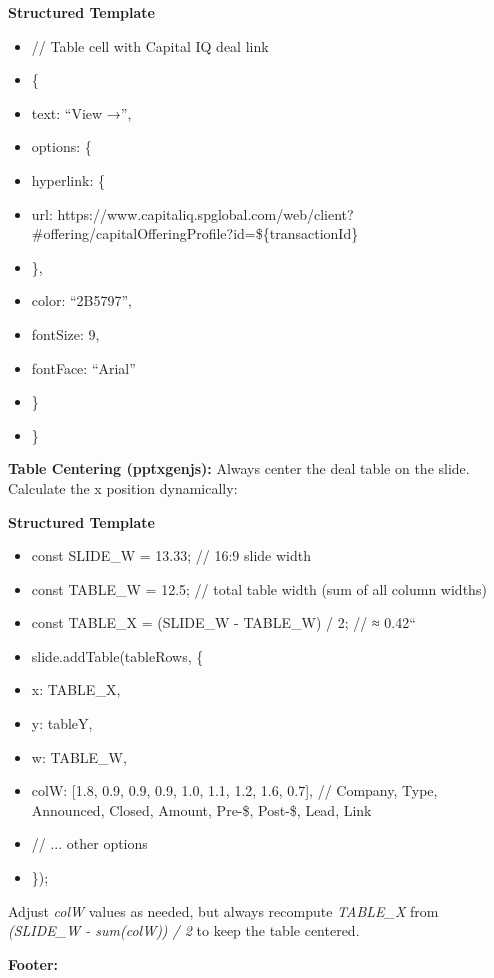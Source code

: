 \documentclass[11pt]{article}
\begin{document}
\textbf{Structured Template}
\begin{itemize}[leftmargin=*,itemsep=2pt,topsep=2pt]
\item {} // Table cell with Capital IQ deal link
\item {} \{
\item {} text: ``View →'',
\item {} options: \{
\item {} hyperlink: \{
\item {} url: https://www.capitaliq.spglobal.com/web/client?\#offering/capitalOfferingProfile?id=\$\{transactionId\}
\item {} \},
\item {} color: ``2B5797'',
\item {} fontSize: 9,
\item {} fontFace: ``Arial''
\item {} \}
\item {} \}
\end{itemize}

\textbf{Table Centering (pptxgenjs):} Always center the deal table on the slide. Calculate the x position dynamically:

\textbf{Structured Template}
\begin{itemize}[leftmargin=*,itemsep=2pt,topsep=2pt]
\item {} const SLIDE\_\allowbreak{}W = 13.33; // 16:9 slide width
\item {} const TABLE\_\allowbreak{}W = 12.5; // total table width (sum of all column widths)
\item {} const TABLE\_\allowbreak{}X = (SLIDE\_\allowbreak{}W - TABLE\_\allowbreak{}W) / 2; // ≈ 0.42``
\item {} slide.addTable(tableRows, \{
\item {} x: TABLE\_\allowbreak{}X,
\item {} y: tableY,
\item {} w: TABLE\_\allowbreak{}W,
\item {} colW: [1.8, 0.9, 0.9, 0.9, 1.0, 1.1, 1.2, 1.6, 0.7], // Company, Type, Announced, Closed, Amount, Pre-\$, Post-\$, Lead, Link
\item {} // ... other options
\item {} \});
\end{itemize}
Adjust \emph{colW} values as needed, but always recompute \emph{TABLE\_\allowbreak{}X} from \emph{(SLIDE\_\allowbreak{}W - sum(colW)) / 2} to keep the table centered.


\textbf{Footer:}
\end{document}
